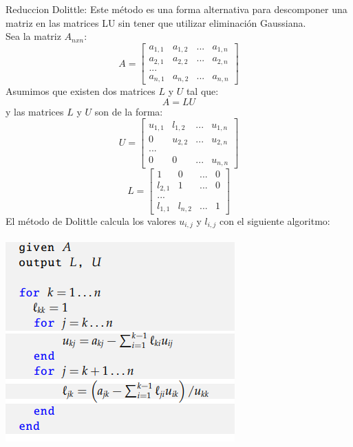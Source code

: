 Reduccion Dolittle:
Este método es una forma alternativa para descomponer una matriz en las matrices LU sin tener que utilizar eliminación Gaussiana.
\\ Sea la matriz $A_{nxn}$:
$$A=\begin{bmatrix}
    a_{1,1}&a_{1,2}&...&a_{1,n}\\
    a_{2,1}&a_{2,2}&...&a_{2,n}\\
    ...\\
    a_{n,1}&a_{n,2}&...&a_{n,n}
\end{bmatrix}$$
Asumimos que existen dos matrices $L$ y $U$ tal que:
$$A=LU$$
y las matrices $L$ y $U$ son de la forma:
$$U=\begin{bmatrix}
    u_{1,1}&l_{1,2}&...&u_{1,n}\\
    0&u_{2,2}&...&u_{2,n}\\
    ...\\
    0&0&...&u_{n,n}
\end{bmatrix}$$
$$L=\begin{bmatrix}
    1&0&...&0\\
    l_{2,1}&1&...&0\\
    ...\\
    l_{1,1}&l_{n,2}&...&1
\end{bmatrix}$$
El método de Dolittle calcula los valores $u_{i,j}$ y $l_{i,j}$ con el siguiente algoritmo: \\\\

\includegraphics{images/dolittleAlg.PNG}


